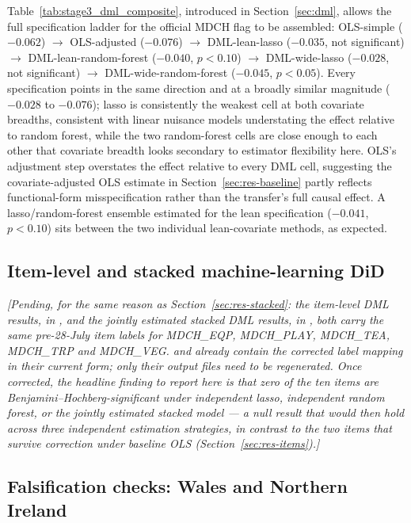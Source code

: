 Table~\ref{tab:stage3_dml_composite}, introduced in Section~\ref{sec:dml}, allows the full specification ladder for the official MDCH flag to be assembled: OLS-simple ($-0.062$) $\rightarrow$ OLS-adjusted ($-0.076$) $\rightarrow$ DML-lean-lasso ($-0.035$, not significant) $\rightarrow$ DML-lean-random-forest ($-0.040$, $p<0.10$) $\rightarrow$ DML-wide-lasso ($-0.028$, not significant) $\rightarrow$ DML-wide-random-forest ($-0.045$, $p<0.05$). Every specification points in the same direction and at a broadly similar magnitude ($-0.028$ to $-0.076$); lasso is consistently the weakest cell at both covariate breadths, consistent with linear nuisance models understating the effect relative to random forest, while the two random-forest cells are close enough to each other that covariate breadth looks secondary to estimator flexibility here. OLS's adjustment step overstates the effect relative to every DML cell, suggesting the covariate-adjusted OLS estimate in Section~\ref{sec:res-baseline} partly reflects functional-form misspecification rather than the transfer's full causal effect. A lasso/random-forest ensemble estimated for the lean specification ($-0.041$, $p<0.10$) sits between the two individual lean-covariate methods, as expected.

\subsection{Item-level and stacked machine-learning DiD}
\label{sec:res-item-dml}

\emph{[Pending, for the same reason as Section~\ref{sec:res-stacked}: the item-level DML results, in , and the jointly estimated stacked DML results, in , both carry the same pre-28-July item labels for MDCH\_EQP, MDCH\_PLAY, MDCH\_TEA, MDCH\_TRP and MDCH\_VEG.  and  already contain the corrected label mapping in their current form; only their output files need to be regenerated. Once corrected, the headline finding to report here is that zero of the ten items are Benjamini--Hochberg-significant under independent lasso, independent random forest, or the jointly estimated stacked model --- a null result that would then hold across three independent estimation strategies, in contrast to the two items that survive correction under baseline OLS (Section~\ref{sec:res-items}).]}

\subsection{Falsification checks: Wales and Northern Ireland}
\label{sec:res-placebo}

